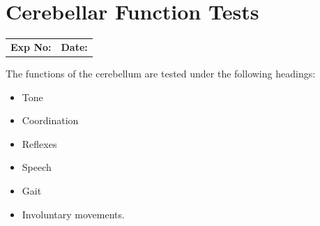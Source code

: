 \documentclass[a4paper,12pt,openany,oneside]{book}
\begin{document}
\chapter*{\centering Cerebellar Function Tests}
															\begin{tabular}{p{5in} p{1in}}
																\textbf{Exp No:}  & \textbf{Date:}\\
															\end{tabular}
The functions of the cerebellum are tested under the following headings:
\begin{itemize}
\item{Tone}
\item{Coordination}
\item{Reflexes}
\item{Speech}
\item{Gait}
\item{Involuntary movements.}
\end{itemize}
\end{document}
